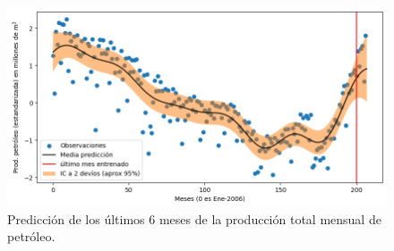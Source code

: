 \documentclass[a4paper]{article}
\newcommand{\gp}{\ensuremath{\mathcal{GP}}}
\begin{document}
\begin{figure}[H]
	\centering
	\includegraphics[trim={0cm 0cm 0cm 0cm},clip,width=.9\textwidth]{pred3.png}
	\caption{Predicción de los últimos 6 meses de la producción total mensual de petróleo.}
	\label{fig:pred3}
\end{figure}


%	
%	
%	
\end{document}
